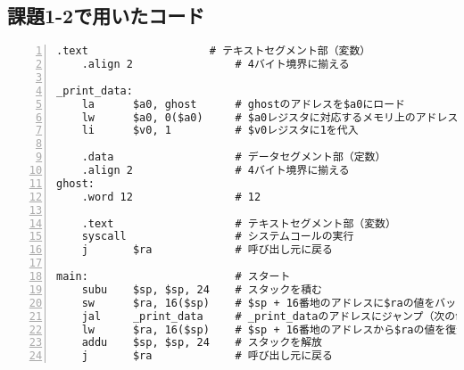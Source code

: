 \subsection{課題1-2で用いたコード} \label{sec:p1-2}
\begin{Verbatim}[numbers=left, xleftmargin=10mm, numbersep=6pt,
                    fontsize=\small, baselinestretch=0.8]
    .text                   # テキストセグメント部（変数）
    .align 2                # 4バイト境界に揃える

_print_data:
    la      $a0, ghost      # ghostのアドレスを$a0にロード
    lw      $a0, 0($a0)     # $a0レジスタに対応するメモリ上のアドレスのワードを自身にロード
    li      $v0, 1          # $v0レジスタに1を代入

    .data                   # データセグメント部（定数）
    .align 2                # 4バイト境界に揃える
ghost:
    .word 12                # 12

    .text                   # テキストセグメント部（変数）
    syscall                 # システムコールの実行
    j       $ra             # 呼び出し元に戻る

main:                       # スタート
    subu    $sp, $sp, 24    # スタックを積む
    sw      $ra, 16($sp)    # $sp + 16番地のアドレスに$raの値をバックアップ
    jal     _print_data     # _print_dataのアドレスにジャンプ（次の命令のアドレスを$raに）
    lw      $ra, 16($sp)    # $sp + 16番地のアドレスから$raの値を復元
    addu    $sp, $sp, 24    # スタックを解放
    j       $ra             # 呼び出し元に戻る
\end{Verbatim}


